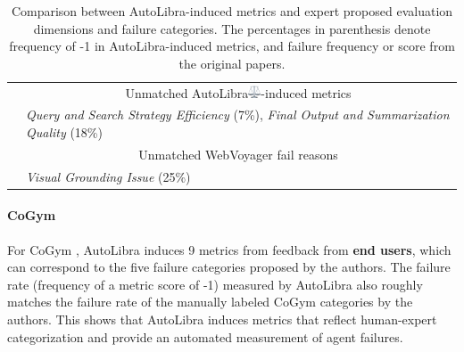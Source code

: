 \begin{table}[!t]
\begin{tabular}{@{}lp{}p{}@{}}
        \cmidrule(lr){2-3}
        & \multicolumn{2}{c}{Unmatched AutoLibra\protect\includegraphics[height=1em]{figs/scale.png}-induced metrics} \\
        \cmidrule(lr){2-3}
        & \multicolumn{2}{C{0.93\textwidth}}{\cellcolor{unmatched}\textit{Query and Search Strategy Efficiency} (7\%), \textit{Final Output and Summarization Quality} (18\%)} \\
        \cmidrule(lr){2-3}
        & \multicolumn{2}{c}{Unmatched WebVoyager fail reasons} \\
        \cmidrule(lr){2-3}
        & \multicolumn{2}{C{0.93\textwidth}}{\cellcolor{unmatched}\textit{Visual Grounding Issue} (25\%)} \\
        \bottomrule
    \end{tabular}
    \caption{Comparison between AutoLibra-induced metrics and expert proposed evaluation dimensions and failure categories. The percentages in parenthesis denote frequency of -1 in AutoLibra-induced metrics, and failure frequency or score from the original papers.}
    \label{tab:merged_comparison}
    \vspace{-20pt}
\end{table}





\paragraph{CoGym}
For CoGym \citep{shao2024collaborative}, 
AutoLibra induces 9 metrics from feedback from \textbf{end users}, which can correspond to the five failure categories proposed by the authors.
The failure rate (frequency of a metric score of -1) measured by AutoLibra also roughly matches the failure rate of the manually labeled CoGym categories by the authors.
This shows that AutoLibra induces metrics that reflect human-expert categorization and provide an automated measurement of agent failures.





